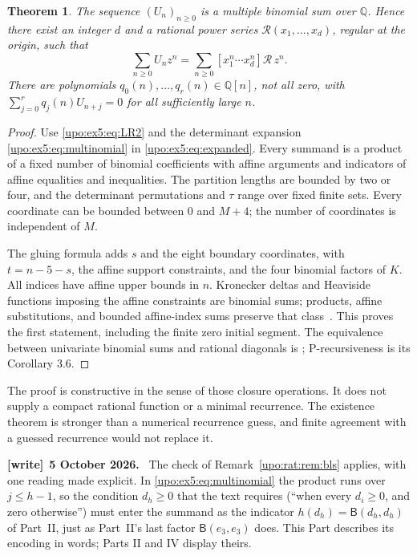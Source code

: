 \documentclass[11pt,letterpaper]{article}
\newtheorem{theorem}{Theorem}[section]
\theoremstyle{remark}\newtheorem{remark}[theorem]{Remark}
\numberwithin{equation}{section}
\newenvironment{writenote}[1][]{\par\smallskip\begingroup\small
 \noindent\textbf{[write]}\if\relax\detokenize{#1}\relax\else~\textbf{#1.}\fi\ }%
 {\par\endgroup\smallskip}
\begin{document}
\begin{theorem}\label{upo:ex5:thm:diagonal}
The sequence $(U_n)_{n\ge0}$ is a multiple binomial sum over
$\mathbb Q$. Hence there exist an integer $d$ and a rational power
series $\mathcal R(x_1,\ldots,x_d)$, regular at the origin, such that
\[
 \sum_{n\ge0}U_n z^n
   =\sum_{n\ge0}[x_1^n\cdots x_d^n]\mathcal R\,z^n.
\]
There are polynomials $q_0(n),\ldots,q_r(n)\in\mathbb Q[n]$, not
all zero, with $\sum_{j=0}^r q_j(n)U_{n+j}=0$ for all sufficiently
large $n$.
\end{theorem}
\begin{proof}
Use \eqref{upo:ex5:eq:LR2} and the determinant expansion
\eqref{upo:ex5:eq:multinomial} in \eqref{upo:ex5:eq:expanded}. Every summand is a
product of a fixed number of binomial coefficients with affine
arguments and indicators of affine equalities and inequalities.
The partition lengths are bounded by two or four, and the determinant
permutations and $\tau$ range over fixed finite sets. Every coordinate
can be bounded between 0 and $M+4$; the number of coordinates is
independent of $M$.

The gluing formula adds $s$ and the eight boundary coordinates, with
$t=n-5-s$, the affine support constraints, and the four binomial
factors of $K$. All indices have affine upper bounds in $n$.
Kronecker deltas and Heaviside functions imposing the affine
constraints are binomial sums; products, affine substitutions, and
bounded affine-index sums preserve that class~\cite[Definition 1.1
and Section 1]{BLS}. This proves the first statement, including the
finite zero initial segment. The equivalence between univariate
binomial sums and rational diagonals is \cite[Theorem 3.5]{BLS};
P-recursiveness is its Corollary 3.6.
\end{proof}

The proof is constructive in the sense of those closure operations.
It does not supply a compact rational function or a minimal recurrence.
The existence theorem is stronger than a numerical recurrence guess,
and finite agreement with a guessed recurrence would not replace it.
\begin{writenote}[5 October 2026]
The check of Remark~\ref{upo:rat:rem:bls} applies, with one reading made explicit. In \eqref{upo:ex5:eq:multinomial} the product runs over $j\le h-1$, so the condition $d_h\ge0$ that the text requires (``when every $d_i\ge0$, and zero otherwise'') must enter the summand as the indicator $h(d_h)=\mathsf B(d_h,d_h)$ of Part~II, just as Part~II's last factor $\mathsf B(e_3,e_3)$ does. This Part describes its encoding in words; Parts II and IV display theirs.
\end{writenote}
\end{document}
